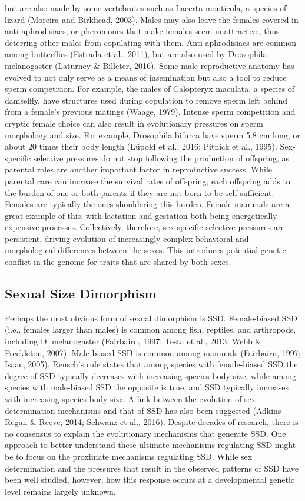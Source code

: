 \documentclass[
  11pt,
]{article}
\begin{document}
but are also made by some vertebrates such as Lacerta monticola, a
species of lizard (Moreira and Birkhead, 2003). Males may also leave the
females covered in anti-aphrodisiacs, or pheromones that make females
seem unattractive, thus deterring other males from copulating with them.
Anti-aphrodisiacs are common among butterflies (Estrada et al., 2011),
but are also used by Drosophila melanogaster (Laturney \& Billeter,
2016). Some male reproductive anatomy has evolved to not only serve as a
means of insemination but also a tool to reduce sperm competition. For
example, the males of Calopteryx maculata, a species of damselfly, have
structures used during copulation to remove sperm left behind from a
female's previous matings (Waage, 1979). Intense sperm competition and
cryptic female choice can also result in evolutionary pressures on sperm
morphology and size. For example, Drosophila bifurca have sperm 5.8 cm
long, or about 20 times their body length (Lüpold et al., 2016; Pitnick
et al., 1995). Sex-specific selective pressures do not stop following
the production of offspring, as parental roles are another important
factor in reproductive success. While parental care can increase the
survival rates of offspring, each offspring adds to the burden of one or
both parents if they are not born to be self-sufficient. Females are
typically the ones shouldering this burden. Female mammals are a great
example of this, with lactation and gestation both being energetically
expensive processes. Collectively, therefore, sex-specific selective
pressures are persistent, driving evolution of increasingly complex
behavioral and morphological differences between the sexes. This
introduces potential genetic conflict in the genome for traits that are
shared by both sexes.

\subsection{Sexual Size Dimorphism}

Perhaps the most obvious form of sexual dimorphism is SSD. Female-biased
SSD (i.e., females larger than males) is common among fish, reptiles,
and arthropods, including D. melanogaster (Fairbairn, 1997; Testa et
al., 2013; Webb \& Freckleton, 2007). Male-biased SSD is common among
mammals (Fairbairn, 1997; Isaac, 2005). Rensch's rule states that among
species with female-biased SSD the degree of SSD typically decreases
with increasing species body size, while among species with male-biased
SSD the opposite is true, and SSD typically increases with increasing
species body size. A link between the evolution of sex-determination
mechanisms and that of SSD has also been suggested (Adkins-Regan \&
Reeve, 2014; Schwanz et al., 2016). Despite decades of research, there
is no consensus to explain the evolutionary mechanisms that generate
SSD. One approach to better understand these ultimate mechanisms
regulating SSD might be to focus on the proximate mechanisms regulating
SSD. While sex determination and the pressures that result in the
observed patterns of SSD have been well studied, however, how this
response occurs at a developmental genetic level remains largely
unknown.
\end{document}
